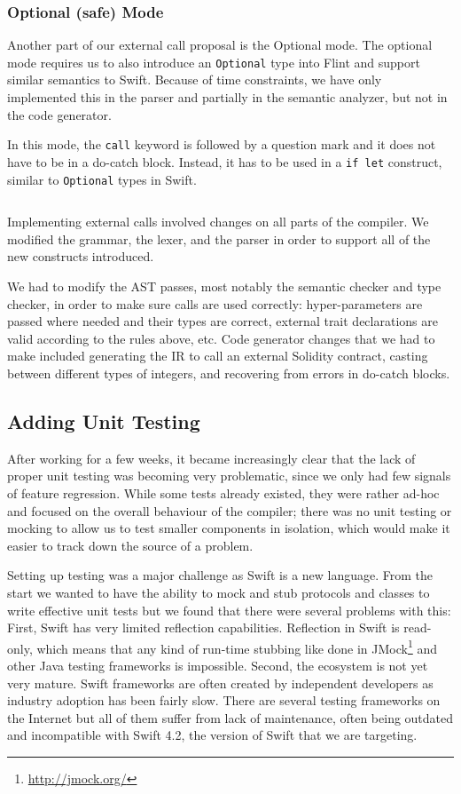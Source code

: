 \subsubsection{Optional (safe) Mode}

Another part of our external call proposal is the Optional mode. The optional mode requires us to also introduce an \texttt{Optional} type into Flint and support similar semantics to Swift. Because of time constraints, we have only implemented this in the parser and partially in the semantic analyzer, but not in the code generator.

In this mode, the \texttt{call} keyword is followed by a question mark and it does not have to be in a do-catch block. Instead, it has to be used in a \texttt{if let} construct, similar to \texttt{Optional} types in Swift.

\inputminted{swift}{code/xcall-4.flint}

Implementing external calls involved changes on all parts of the compiler. We modified the grammar, the lexer, and the parser in order to support all of the new constructs introduced. 

We had to modify the AST passes, most notably the semantic checker and type checker, in order to make sure calls are used correctly: hyper-parameters are passed where needed and their types are correct, external trait declarations are valid according to the rules above, etc. Code generator changes that we had to make included generating the IR to call an external Solidity contract, casting between different types of integers, and recovering from errors in do-catch blocks.

\subsection{Adding Unit Testing}

After working for a few weeks, it became increasingly clear that the lack of proper unit testing was becoming very problematic, since we only had few signals of feature regression. While some tests already existed, they were rather ad-hoc and focused on the overall behaviour of the compiler; there was no unit testing or mocking to allow us to test smaller components in isolation, which would make it easier to track down the source of a problem.

Setting up testing was a major challenge as Swift is a new language. From the start we wanted to have the ability to mock and stub protocols and classes to write effective unit tests but we found that there were several problems with this: First, Swift has very limited reflection capabilities. Reflection in Swift is read-only, which means that any kind of run-time stubbing like done in JMock\footnote{\url{http://jmock.org/}} and other Java testing frameworks is impossible. Second, the ecosystem is not yet very mature. Swift frameworks are often created by independent developers as industry adoption has been fairly slow. There are several testing frameworks on the Internet but all of them suffer from lack of maintenance, often being outdated and incompatible with Swift 4.2, the version of Swift that we are targeting.

